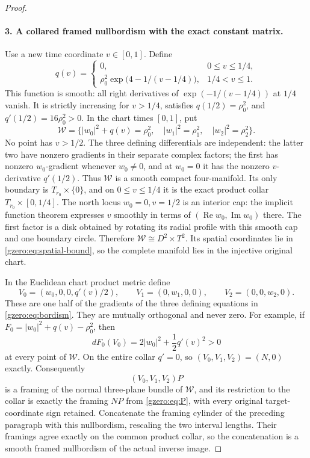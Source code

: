 \documentclass[11pt]{article}
\theoremstyle{definition}
\begin{document}
\begin{proof}
\paragraph{3. A collared framed nullbordism with the exact constant matrix.}
Use a new time coordinate \(v\in[0,1]\). Define
\begin{equation}
 q(v)=
 \begin{cases}
 0,&0\leq v\leq1/4,\\
 \rho_0^2\exp\bigl(4-1/(v-1/4)\bigr),&1/4<v\leq1.
 \end{cases}
 \label{gzero:eq:q}
\end{equation}
This function is smooth: all right derivatives of
\(\exp(-1/(v-1/4))\) at \(1/4\) vanish. It is strictly increasing
for \(v>1/4\), satisfies \(q(1/2)=\rho_0^2\), and
\(q'(1/2)=16\rho_0^2>0\).
In the chart times \([0,1]\), put
\begin{equation}
 \mathcal W=
 \{|w_0|^2+q(v)=\rho_0^2,\quad
       |w_1|^2=\rho_1^2,\quad|w_2|^2=\rho_2^2\}.
 \label{gzero:eq:bordism}
\end{equation}
No point has \(v>1/2\). The three defining differentials are independent:
the latter two have nonzero gradients in their separate complex factors;
the first has nonzero \(w_0\)-gradient whenever \(w_0\ne0\), and at
\(w_0=0\) it has the nonzero \(v\)-derivative \(q'(1/2)\).
Thus \(\mathcal W\) is a smooth compact four-manifold. Its only
boundary is \(T_{r_0}\times\{0\}\), and on \(0\leq v\leq1/4\)
it is the exact product collar \(T_{r_0}\times[0,1/4]\).
The north locus \(w_0=0,v=1/2\) is an interior cap: the implicit
function theorem expresses \(v\) smoothly in terms of
\((\operatorname{Re}w_0,\operatorname{Im}w_0)\) there. The first
factor is a disk obtained by rotating its radial profile with this smooth
cap and one boundary circle. Therefore
\(\mathcal W\cong D^2\times T^2\).
Its spatial coordinates lie in \eqref{gzero:eq:spatial-bound}, so the complete
manifold lies in the injective original chart.

In the Euclidean chart product metric define
\[
 V_0=(w_0,0,0,q'(v)/2),\qquad
 V_1=(0,w_1,0,0),\qquad V_2=(0,0,w_2,0).
\]
These are one half of the gradients of the three defining equations
in \eqref{gzero:eq:bordism}. They are mutually orthogonal and never zero.
For example, if \(F_0=|w_0|^2+q(v)-\rho_0^2\), then
\[
 dF_0(V_0)=2|w_0|^2+\frac12q'(v)^2>0
\]
at every point of \(\mathcal W\). On the entire collar \(q'=0\), so
\((V_0,V_1,V_2)=(N,0)\) exactly. Consequently
\begin{equation}
 (V_0,V_1,V_2)P
 \label{gzero:eq:extended-frame}
\end{equation}
is a framing of the normal three-plane bundle of \(\mathcal W\),
and its restriction to the collar is exactly the framing \(NP\) from
\eqref{gzero:eq:P}, with every original target-coordinate sign retained.
Concatenate the framing cylinder of the preceding paragraph with this
nullbordism, rescaling the two interval lengths. Their framings agree
exactly on the common product collar, so the concatenation is a smooth
framed nullbordism of the actual inverse image.


\end{proof}
\end{document}
